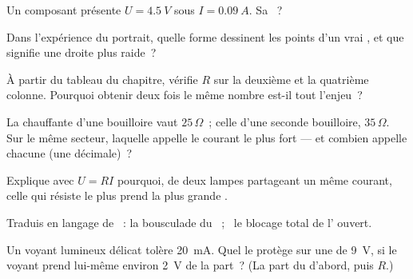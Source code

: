 \begin{exercise}[$\star$]\label{exo:g8:ohms-law:3}
Un composant présente $U = \qty{4.5}{V}$ sous $I = \qty{0.09}{A}$.
Sa ~?
\end{exercise}

\begin{exercise}[$\star$]\label{exo:g8:ohms-law:4}
Dans l'expérience du portrait, quelle forme dessinent les points d'un
vrai , et que signifie une droite plus raide~?
\end{exercise}

\begin{exercise}[$\star$]\label{exo:g8:ohms-law:5}
À partir du tableau du chapitre, vérifie $R$ sur la deuxième et la
quatrième colonne. Pourquoi obtenir deux fois le même nombre est-il
tout l'enjeu~?
\end{exercise}

\begin{exercise}[$\star$]\label{exo:g8:ohms-law:6}
La  chauffante d'une bouilloire vaut $25\,\Omega$~; celle
d'une seconde bouilloire, $35\,\Omega$. Sur le même secteur, laquelle
appelle le courant le plus fort --- et combien appelle chacune (une
décimale)~?
\end{exercise}

\begin{exercise}[$\star$]\label{exo:g8:ohms-law:7}
Explique avec $U = R I$ pourquoi, de deux lampes  partageant
un même courant, celle qui résiste le plus prend la plus grande
.
\end{exercise}

\begin{exercise}[$\star$]\label{exo:g8:ohms-law:8}
Traduis en langage de ~: la bousculade du ~;
\ le blocage total de l' ouvert.
\end{exercise}

\begin{exercise}[$\star\star$]\label{exo:g8:ohms-law:9}
Un voyant lumineux délicat tolère \qty{20}{mA}. Quel   le protège sur une  de \qty{9}{V}, si le voyant prend
lui-même environ \qty{2}{V} de la part~? (La part du 
d'abord, puis $R$.)
\end{exercise}

